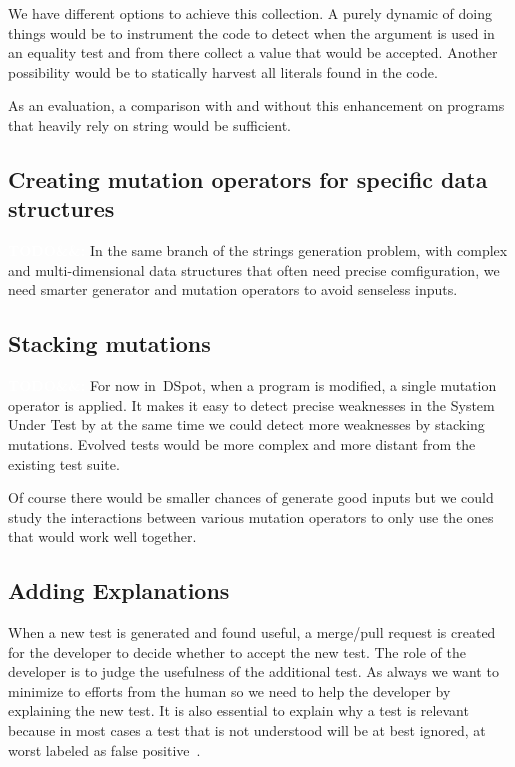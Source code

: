 \documentclass[11pt]{sdm}
\newcommand{\todo}[1]{\colorbox{Red!75}{\textcolor{white}{\textbf{TODO\ifx&#1&\else: #1\fi}}}}
\newcommand{\dspot}{DSpot\xspace}
\begin{document}
We have different options to achieve this collection.
A purely dynamic of doing things would be to instrument the code to detect when the argument is used in an equality test and from there collect a value that would be accepted.
Another possibility would be to statically harvest all literals found in the code.

As an evaluation, a comparison with and without this enhancement on programs that heavily rely on string would be sufficient.

\subsection{Creating mutation operators for specific data structures}
\label{create_operators}
\todo{}
In the same branch of the strings generation problem, with complex and multi-dimensional data structures that often need precise comfiguration, we need smarter generator and mutation operators to avoid senseless inputs.

\subsection{Stacking mutations}
\label{stacking}
\todo{}
For now in~\dspot{}, when a program is modified, a single mutation operator is applied.
It makes it easy to detect precise weaknesses in the System Under Test by at the same time we could detect more weaknesses by stacking mutations.
Evolved tests would be more complex and more distant from the existing test suite.

Of course there would be smaller chances of generate good inputs but we could study the interactions between various mutation operators to only use the ones that would work well together.

\subsection{Adding Explanations}
\label{explanation}
When a new test is generated and found useful, a merge/pull request is created for the developer to decide whether to accept the new test.
The role of the developer is to judge the usefulness of the additional test.
As always we want to minimize to efforts from the human so we need to help the developer by explaining the new test.
It is also essential to explain why a test is relevant because in most cases a test that is not understood will be at best ignored, at worst labeled as false positive~\cite{bessey2010few}.
\end{document}
